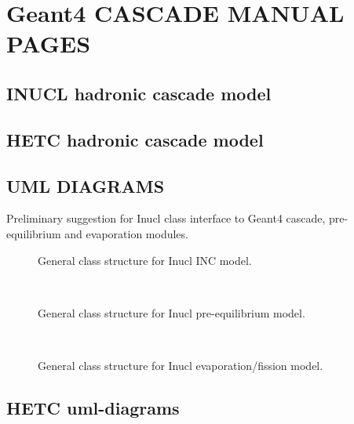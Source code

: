 \section{{\sc Geant4} CASCADE MANUAL PAGES}
\label{manual:}
\subsection{INUCL hadronic cascade model}

\subsection{HETC hadronic cascade model} 


\subsection{UML DIAGRAMS}
Preliminary suggestion for Inucl class interface to Geant4 cascade, pre-equilibrium
and evaporation modules.

\begin{figure}
  \begin{center}
    \leavevmode
       \caption{General class structure for Inucl INC model.}
  \label{massPb}
  \end{center}
\end{figure}

\begin{figure}
  \begin{center}
    \leavevmode
    \mbox{\epsfxsize=8cm  }
       \caption{General class structure for Inucl pre-equilibrium model.}
  \label{massPb}
  \end{center}
\end{figure}

\begin{figure}
  \begin{center}
    \leavevmode
    \mbox{\epsfxsize=8cm   }
       \caption{General class structure for Inucl evaporation/fission model.}
  \label{massPb}
  \end{center}
\end{figure}


\subsection{HETC uml-diagrams} %
\begin{figure}[h]
\leavevmode
\begin{flushleft}
\end{flushleft}
\end{figure}


